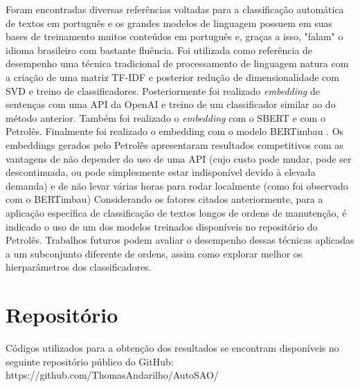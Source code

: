\documentclass[conference]{IEEEtran}
\begin{document}
  Foram encontradas diversas referências voltadas para a classificação automática de textos em português e os grandes modelos de linguagem possuem em suas bases de treinamento muitos conteúdos em português e, graças a isso, "falam" o idioma brasileiro com bastante fluência.
  Foi utilizada como referência de desempenho uma técnica tradicional de processamento de linguagem natura com a criação de uma matriz TF-IDF e posterior redução de dimensionalidade com SVD e treino de classificadores. Posteriormente foi realizado \textit{embedding} de sentenças com uma API da OpenAI e treino de um classificador similar ao do método anterior. Também foi realizado o \textit{embedding} com o SBERT e com o Petrolês. Finalmente foi realizado o embedding com o modelo BERTimbau \cite{souza2020bertimbau}. Os embeddings gerados pelo Petrolês apresentaram resultados competitivos com as vantagens de não depender do uso de uma API (cujo custo pode mudar, pode ser descontinuada, ou pode simplesmente estar indisponível devido à elevada demanda) e de não levar várias horas para rodar localmente (como foi observado com o BERTimbau)
  Considerando os fatores citados anteriormente, para a aplicação específica de classificação de textos longos de ordens de manutenção, é indicado o uso de um dos modelos treinados disponíveis no repositório do Petrolês.
  Trabalhos futuros podem avaliar o desempenho dessas técnicas aplicadas a um subconjunto diferente de ordens, assim como explorar melhor os hierparâmetros dos classificadores.

\section{Repositório}

  Códigos utilizados para a obtenção dos resultados se encontram disponíveis no seguinte repositório público do GitHub: https://github.com/ThomasAndarilho/AutoSAO/



\end{document}
